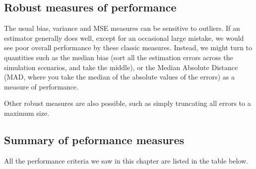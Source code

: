 \documentclass[
]{book}
\begin{document}
\hypertarget{robust-measures-of-performance}{%
\subsection{Robust measures of performance}\label{robust-measures-of-performance}}

The usual bias, variance and MSE measures can be sensitive to outliers.
If an estimator generally does well, except for an occasional large mistake, we would see poor overall performance by these classic measures.
Instead, we might turn to quantities such as the median bias (sort all the estimation errors across the simulation scenarios, and take the middle), or the Median Absolute Distance (MAD, where you take the median of the absolute values of the errors) as a measure of performance.

Other robust measures are also possible, such as simply truncating all errors to a maximum size.

\hypertarget{summary-of-peformance-measures}{%
\subsection{Summary of peformance measures}\label{summary-of-peformance-measures}}

All the performance criteria we saw in this chapter are listed in the table below.
\end{document}
